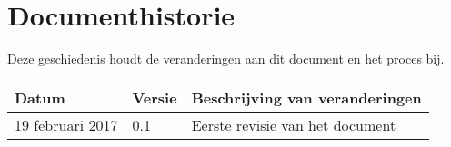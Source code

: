 \chapter{Documenthistorie}

Deze geschiedenis houdt de veranderingen aan dit document en het proces bij. \\

\begin{tabular}{|l|l|l|}
	\hline
	Datum & Versie & Beschrijving van veranderingen \\ \hline
	19 februari 2017 & 0.1 & Eerste revisie van het document \\ \hline
\end{tabular}